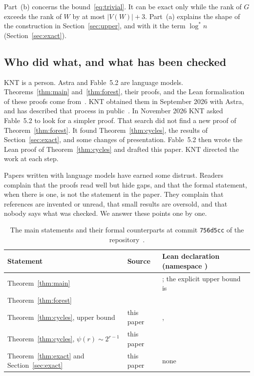 \documentclass[11pt]{article}
\theoremstyle{definition}
\theoremstyle{remark}
\newcommand{\lgs}{\log^{*}}
\numberwithin{equation}{section}
\begin{document}
Part~(b) concerns the bound~\eqref{eq:trivial}. It can be exact only while the rank of $G$ exceeds
the rank of $W$ by at most $|V(W)|+3$. Part~(a) explains the shape of the construction in
Section~\ref{sec:upper}, and with it the term $\lgs n$ (Section~\ref{sec:exact}).

\subsection{Who did what, and what has been checked}\label{sec:status}

KNT is a person. Astra and Fable~5.2 are language models. Theorems~\ref{thm:main}
and~\ref{thm:forest}, their proofs, and the Lean formalisation of these proofs come
from~\cite{KNT}. KNT obtained them in September 2026 with Astra, and has described that process in
public~\cite{Claim}. In November 2026 KNT asked Fable~5.2 to look for a simpler proof. That search
did not find a new proof of Theorem~\ref{thm:forest}. It found Theorem~\ref{thm:cycles}, the results
of Section~\ref{sec:exact}, and some changes of presentation. Fable~5.2 then wrote the Lean proof of
Theorem~\ref{thm:cycles} and drafted this paper. KNT directed the work at each step.

Papers written with language models have earned some distrust. Readers complain that the proofs
read well but hide gaps, and that the formal statement, when there is one, is not the statement in
the paper. They complain that references are invented or unread, that small results are oversold,
and that nobody says what was checked. We answer these points one by one.

\begin{table}[ht]
\centering\small
\renewcommand{\arraystretch}{1.15}
\begin{tabular}{@{}L{4.3cm}L{1.9cm}L{9.2cm}@{}}
\toprule
Statement & Source & Lean declaration (namespace ) \\
\midrule
Theorem~\ref{thm:main} & \cite{KNT} & ; the explicit upper bound is
   \\
Theorem~\ref{thm:forest} & \cite{KNT} &  \\
Theorem~\ref{thm:cycles}, upper bound & this paper & ,
   \\
Theorem~\ref{thm:cycles}, $\psi(r)\sim2^{r-1}$ & this paper &  \\
Theorem~\ref{thm:exact} and Section~\ref{sec:exact} & this paper & none \\
\bottomrule
\end{tabular}
\caption{The main statements and their formal counterparts at commit \texttt{756d5cc} of the
repository~\cite{Repo}.}\label{tab:status}
\end{table}
\end{document}
